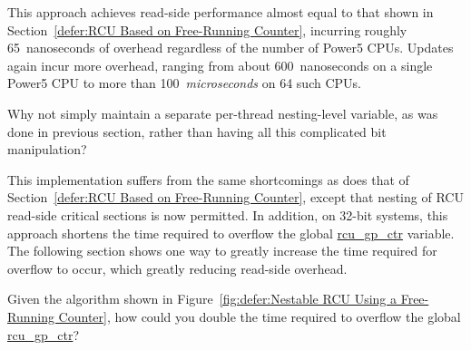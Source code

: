 This approach achieves read-side performance almost equal to that
shown in
Section~\ref{defer:RCU Based on Free-Running Counter}, incurring
roughly 65~nanoseconds of overhead regardless of the number of
Power5 CPUs.
Updates again incur more overhead, ranging from about 600~nanoseconds on
a single Power5 CPU to more than 100~\emph{microseconds} on 64
such CPUs.

\QuickQuiz{}
	Why not simply maintain a separate per-thread nesting-level
	variable, as was done in previous section, rather than having
	all this complicated bit manipulation?
 \QuickQuizEnd

This implementation suffers from the same shortcomings as does that of
Section~\ref{defer:RCU Based on Free-Running Counter}, except that
nesting of RCU read-side critical sections is now permitted.
In addition, on 32-bit systems, this approach shortens the time
required to overflow the global \url{rcu_gp_ctr} variable.
The following section shows one way to greatly increase the time
required for overflow to occur, which greatly reducing read-side
overhead.

\QuickQuiz{}
	Given the algorithm shown in
	Figure~\ref{fig:defer:Nestable RCU Using a Free-Running Counter},
	how could you double the time required to overflow the global
	\url{rcu_gp_ctr}?
 \QuickQuizEnd

